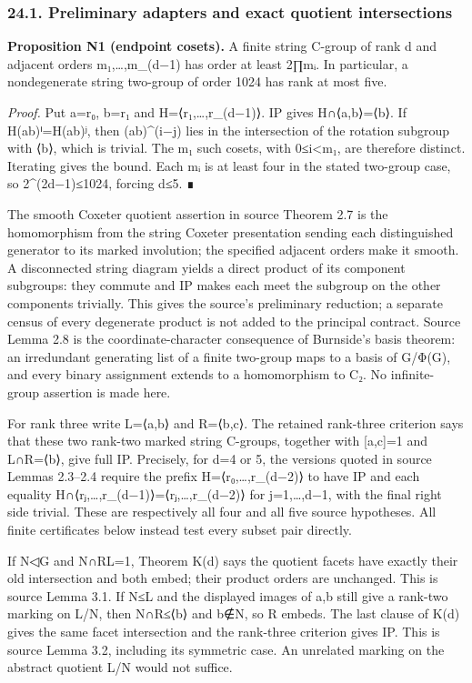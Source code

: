 \documentclass[
  10pt,
  letterpaper,
]{article}
\begin{document}
\subsubsection{24.1. Preliminary adapters and exact quotient
intersections}\label{preliminary-adapters-and-exact-quotient-intersections}

\textbf{Proposition N1 (endpoint cosets).} A finite string C-group of
rank d and adjacent orders m₁,\ldots,m\_(d−1) has order at least 2∏mᵢ.
In particular, a nondegenerate string two-group of order 1024 has rank
at most five.

\emph{Proof.} Put a=r₀, b=r₁ and H=⟨r₁,\ldots,r\_(d−1)⟩. IP gives
H∩⟨a,b⟩=⟨b⟩. If H(ab)ⁱ=H(ab)ʲ, then (ab)\^{}(i−j) lies in the
intersection of the rotation subgroup with ⟨b⟩, which is trivial. The m₁
such cosets, with 0≤i\textless m₁, are therefore distinct. Iterating
gives the bound. Each mᵢ is at least four in the stated two-group case,
so 2\^{}(2d−1)≤1024, forcing d≤5. ∎

The smooth Coxeter quotient assertion in source Theorem 2.7 is the
homomorphism from the string Coxeter presentation sending each
distinguished generator to its marked involution; the specified adjacent
orders make it smooth. A disconnected string diagram yields a direct
product of its component subgroups: they commute and IP makes each meet
the subgroup on the other components trivially. This gives the source's
preliminary reduction; a separate census of every degenerate product is
not added to the principal contract. Source Lemma 2.8 is the
coordinate-character consequence of Burnside's basis theorem: an
irredundant generating list of a finite two-group maps to a basis of
G/Φ(G), and every binary assignment extends to a homomorphism to C₂. No
infinite-group assertion is made here.

For rank three write L=⟨a,b⟩ and R=⟨b,c⟩. The retained rank-three
criterion says that these two rank-two marked string C-groups, together
with {[}a,c{]}=1 and L∩R=⟨b⟩, give full IP. Precisely, for d=4 or 5, the
versions quoted in source Lemmas 2.3--2.4 require the prefix
H=⟨r₀,\ldots,r\_(d−2)⟩ to have IP and each equality
H∩⟨rⱼ,\ldots,r\_(d−1)⟩=⟨rⱼ,\ldots,r\_(d−2)⟩ for j=1,\ldots,d−1, with the
final right side trivial. These are respectively all four and all five
source hypotheses. All finite certificates below instead test every
subset pair directly.

If N◁G and N∩RL=1, Theorem K(d) says the quotient facets have exactly
their old intersection and both embed; their product orders are
unchanged. This is source Lemma 3.1. If N≤L and the displayed images of
a,b still give a rank-two marking on L/N, then N∩R≤⟨b⟩ and b∉N, so R
embeds. The last clause of K(d) gives the same facet intersection and
the rank-three criterion gives IP. This is source Lemma 3.2, including
its symmetric case. An unrelated marking on the abstract quotient L/N
would not suffice.
\end{document}
